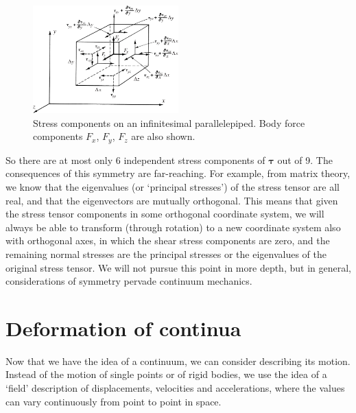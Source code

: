 \documentclass[twoside,11pt]		{report}
\begin{document}
\begin{figure}
\begin{center}
\includegraphics[width=0.5\textwidth]{Fung-3.8.eps}
\end{center}
\caption{Stress components on an infinitesimal parallelepiped. Body
  force components $F_x$, $F_y$, $F_z$ are also shown.}
\label{fig.para}
\end{figure}

So there are at most only 6 independent stress components of
$\bm{\tau}$ out of 9. The consequences of this symmetry are
far-reaching. For example, from matrix theory, we know that the
eigenvalues (or `principal stresses') of the stress tensor are all
real, and that the eigenvectors are mutually orthogonal. This means
that given the stress tensor components in some orthogonal coordinate
system, we will always be able to transform (through rotation) to a
new coordinate system also with orthogonal axes, in which the shear
stress components are zero, and the remaining normal stresses are the
principal stresses or the eigenvalues of the original stress
tensor. We will not pursue this point in more depth, but in general,
considerations of symmetry pervade continuum mechanics.


\section{Deformation of continua}

Now that we have the idea of a continuum, we can consider describing
its motion. Instead of the motion of single points or of rigid bodies,
we use the idea of a `field' description of displacements, velocities
and accelerations, where the values can vary continuously from point
to point in space.
\end{document}
